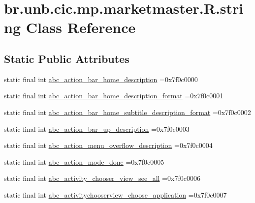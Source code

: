 \hypertarget{classbr_1_1unb_1_1cic_1_1mp_1_1marketmaster_1_1R_1_1string}{}\section{br.\+unb.\+cic.\+mp.\+marketmaster.\+R.\+string Class Reference}
\label{classbr_1_1unb_1_1cic_1_1mp_1_1marketmaster_1_1R_1_1string}
\subsection*{Static Public Attributes}
\begin{DoxyCompactItemize}
\item 
static final int \mbox{\hyperlink{classbr_1_1unb_1_1cic_1_1mp_1_1marketmaster_1_1R_1_1string_a36c0eb2a0962cb6d5d7ec18b0523bd1d}{abc\+\_\+action\+\_\+bar\+\_\+home\+\_\+description}} =0x7f0c0000
\item 
static final int \mbox{\hyperlink{classbr_1_1unb_1_1cic_1_1mp_1_1marketmaster_1_1R_1_1string_a4b844027e3b00453062c4e217d724332}{abc\+\_\+action\+\_\+bar\+\_\+home\+\_\+description\+\_\+format}} =0x7f0c0001
\item 
static final int \mbox{\hyperlink{classbr_1_1unb_1_1cic_1_1mp_1_1marketmaster_1_1R_1_1string_a30d22f8c21fc60d3079b96ab9d9870c2}{abc\+\_\+action\+\_\+bar\+\_\+home\+\_\+subtitle\+\_\+description\+\_\+format}} =0x7f0c0002
\item 
static final int \mbox{\hyperlink{classbr_1_1unb_1_1cic_1_1mp_1_1marketmaster_1_1R_1_1string_a1afb9948a8478f11ccfd923287eafdde}{abc\+\_\+action\+\_\+bar\+\_\+up\+\_\+description}} =0x7f0c0003
\item 
static final int \mbox{\hyperlink{classbr_1_1unb_1_1cic_1_1mp_1_1marketmaster_1_1R_1_1string_a0102df68a5c075844c6f0330c4597499}{abc\+\_\+action\+\_\+menu\+\_\+overflow\+\_\+description}} =0x7f0c0004
\item 
static final int \mbox{\hyperlink{classbr_1_1unb_1_1cic_1_1mp_1_1marketmaster_1_1R_1_1string_a8ca7b777afcc2c9398ab94573fb7a3b3}{abc\+\_\+action\+\_\+mode\+\_\+done}} =0x7f0c0005
\item 
static final int \mbox{\hyperlink{classbr_1_1unb_1_1cic_1_1mp_1_1marketmaster_1_1R_1_1string_add56857d5d00c8a0f10dd23bb88ff823}{abc\+\_\+activity\+\_\+chooser\+\_\+view\+\_\+see\+\_\+all}} =0x7f0c0006
\item 
static final int \mbox{\hyperlink{classbr_1_1unb_1_1cic_1_1mp_1_1marketmaster_1_1R_1_1string_a6d1f00eeadd4ee679a583b8e4278e71f}{abc\+\_\+activitychooserview\+\_\+choose\+\_\+application}} =0x7f0c0007

\end{DoxyCompactItemize}
